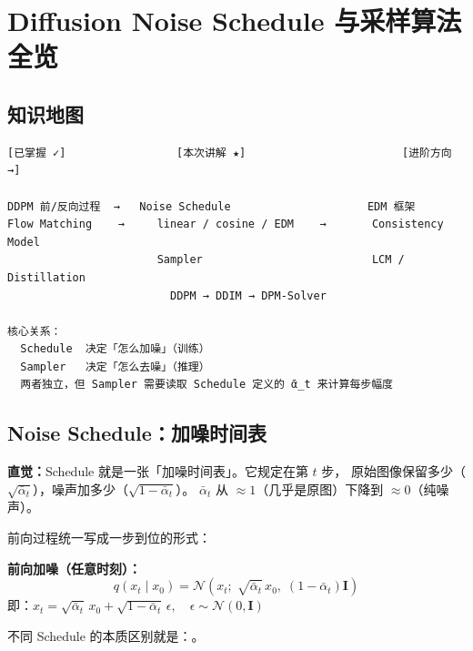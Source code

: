 
\section{Diffusion Noise Schedule 与采样算法全览}


\subsection*{知识地图}

\begin{lstlisting}[language={}]
[已掌握 ✓]                 [本次讲解 ★]                        [进阶方向 →]

DDPM 前/反向过程  →   Noise Schedule                     EDM 框架
Flow Matching    →     linear / cosine / EDM    →       Consistency Model
                       Sampler                          LCM / Distillation
                         DDPM → DDIM → DPM-Solver

核心关系：
  Schedule  决定「怎么加噪」（训练）
  Sampler   决定「怎么去噪」（推理）
  两者独立，但 Sampler 需要读取 Schedule 定义的 ᾱ_t 来计算每步幅度
\end{lstlisting}

\subsection{Noise Schedule：加噪时间表}

\begin{intubox}
\textbf{直觉：}Schedule 就是一张「加噪时间表」。它规定在第 $t$ 步，
原始图像保留多少（$\sqrt{\bar\alpha_t}$），噪声加多少（$\sqrt{1-\bar\alpha_t}$）。
$\bar\alpha_t$ 从 $\approx 1$（几乎是原图）下降到 $\approx 0$（纯噪声）。
\end{intubox}

前向过程统一写成一步到位的形式：

\begin{conceptbox}
\textbf{前向加噪（任意时刻）：}
$$q(x_t \mid x_0) = \mathcal{N}\!\left(x_t;\; \sqrt{\bar\alpha_t}\,x_0,\;
(1-\bar\alpha_t)\mathbf{I}\right)$$
即：$x_t = \sqrt{\bar\alpha_t}\,x_0 + \sqrt{1-\bar\alpha_t}\,\epsilon,
\quad \epsilon \sim \mathcal{N}(0,\mathbf{I})$

不同 Schedule 的本质区别就是：。
\end{conceptbox}

